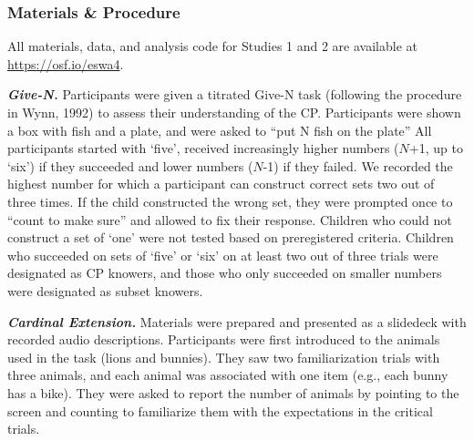 \documentclass[10pt, letterpaper]{article}
\begin{document}
\hypertarget{materials-procedure}{%
\subsubsection{Materials \& Procedure}\label{materials-procedure}}

All materials, data, and analysis code for Studies 1 and 2 are available
at \url{https://osf.io/eswa4}.

\vspace{10pt}

\noindent \textbf{\emph{Give-N.}} Participants were given a titrated
Give-N task (following the procedure in Wynn, 1992) to assess their
understanding of the CP. Participants were shown a box with fish and a
plate, and were asked to ``put N fish on the plate'' All participants
started with `five', received increasingly higher numbers (\(N\)+1, up
to `six') if they succeeded and lower numbers (\(N\)-1) if they failed.
We recorded the highest number for which a participant can construct
correct sets two out of three times. If the child constructed the wrong
set, they were prompted once to ``count to make sure'' and allowed to
fix their response. Children who could not construct a set of `one' were
not tested based on preregistered criteria. Children who succeeded on
sets of `five' or `six' on at least two out of three trials were
designated as CP knowers, and those who only succeeded on smaller
numbers were designated as subset knowers.

\vspace{10pt}

\noindent \textbf{\emph{Cardinal Extension.}} Materials were prepared
and presented as a slidedeck with recorded audio descriptions.
Participants were first introduced to the animals used in the task
(lions and bunnies). They saw two familiarization trials with three
animals, and each animal was associated with one item (e.g., each bunny
has a bike). They were asked to report the number of animals by pointing
to the screen and counting to familiarize them with the expectations in
the critical trials.

\noindent
\end{document}
